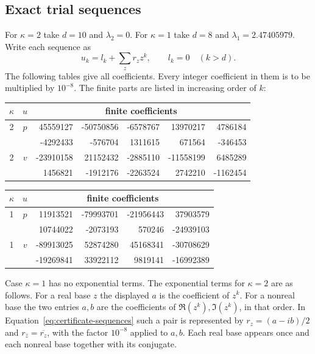 \subsection{Exact trial sequences}
For $\kappa=2$ take $d=10$ and $\lambda_2=0$.  For $\kappa=1$ take
$d=8$ and $\lambda_1=2.47405979$.  Write each sequence as
\begin{equation}\label{eq:certificate-sequences}
 u_k=l_k+\sum_{z}r_z z^k,\qquad l_k=0\quad(k>d).
\end{equation}
The following tables give all coefficients.  Every integer coefficient in
them is to be multiplied by $10^{-8}$.  The finite parts are listed in
increasing order of $k$:
\begin{center}
\begin{tabular}{ccr r r r r}
\toprule
$\kappa$&$u$&\multicolumn{5}{c}{finite coefficients}\\
\midrule
2&$p$&45559127&-50750856&-6578767&13970217&4786184\\
 &&-4292433&-576704&1311615&671564&-346453\\
2&$v$&-23910158&21152432&-2885110&-11558199&6485289\\
 &&1456821&-1912176&-2263524&2742210&-1162454\\
\bottomrule
\end{tabular}

\medskip
\begin{tabular}{ccr r r r}
\toprule
$\kappa$&$u$&\multicolumn{4}{c}{finite coefficients}\\
\midrule
1&$p$&11913521&-79993701&-21956443&37903579\\
 &&10744022&-2073193&570246&-24939103\\
1&$v$&-89913025&52874280&45168341&-30708629\\
 &&-19269841&33922112&9819141&-16992389\\
\bottomrule
\end{tabular}
\end{center}
Case $\kappa=1$ has no exponential terms.  The exponential terms for
$\kappa=2$ are as follows.  For a real base $z$ the displayed $a$ is the
coefficient of $z^k$.  For a nonreal base the two entries $a,b$ are the
coefficients of $\Re(z^k),\Im(z^k)$, in that order.  In
Equation~\eqref{eq:certificate-sequences} such a pair is represented by
$r_z=(a-ib)/2$ and $r_{\bar z}=\overline{r_z}$, with the factor $10^{-8}$
applied to $a,b$.  Each real base appears once and each nonreal base together
with its conjugate.
